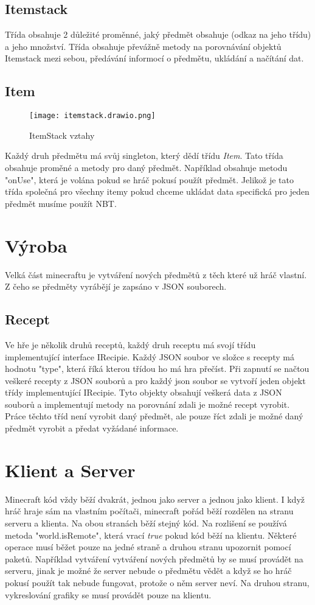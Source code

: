 \documentclass[FM,RP]{tulthesis}
\begin{document}
\subsection{Itemstack}
Třída obsahuje 2 důležité proměnné, jaký předmět obsahuje (odkaz na jeho třídu) a jeho množství. Třída obsahuje převážně metody na porovnávání objektů Itemstack mezi sebou, předávání informocí o předmětu, ukládání a načítání dat.
\subsection{Item}
\begin{figure}[h]
    \centering
    \texttt{[image: itemstack.drawio.png]}
    \caption{ItemStack vztahy}
    \label{fig:enter-label}
\end{figure}
Každý druh předmětu má svůj singleton, který dědí třídu \textit{Item}. Tato třída obsahuje proměné a metody pro daný předmět. Například obsahuje metodu "onUse", která je volána pokud se hráč pokusí použít předmět. Jelikož je tato třída společná pro všechny itemy pokud chceme ukládat data specifická pro jeden předmět musíme použít NBT.
\begin{comment}
    Přidat pod item i výrobu
\end{comment}
\section{Výroba}
Velká část minecraftu je vytváření nových předmětů z těch které už hráč vlastní. Z čeho se předměty vyrábějí je zapsáno v JSON souborech. 
\subsection{Recept}
Ve hře je několik druhů receptů, každý druh receptu má svojí třídu implementující interface IRecipie. Každý JSON soubor ve složce s recepty má hodnotu "type", která říká kterou třídou ho má hra přečíst. Při zapnutí se načtou veškeré recepty z JSON souborů a pro každý json soubor se vytvoří jeden objekt třídy implementující IRecipie. Tyto objekty obsahují veškerá data z JSON souborů a implementují metody na porovnání zdali je možné recept vyrobit. Práce těchto tříd není vyrobit daný předmět, ale pouze říct zdali je možné daný předmět vyrobit a předat vyžádané informace.    
\section{Klient a Server}
Minecraft kód vždy běží dvakrát, jednou jako server a jednou jako klient. I když hráč hraje sám na vlastním počítači, minecraft pořád běží rozdělen na stranu serveru a klienta. Na obou stranách běží stejný kód. Na rozlišení se používá metoda "world.isRemote", která vrací \textit{true} pokud kód běží na klientu. Některé operace musí běžet pouze na jedné straně a druhou stranu upozornit pomocí paketů. Například vytváření vytváření nových předmětů by se musí provádět na serveru, jinak je možné že server nebude o předmětu vědět a když se ho hráč pokusí použít tak nebude fungovat, protože o něm server neví. Na druhou stranu, vykreslování grafiky se musí provádět pouze na klientu. 
\end{document}

